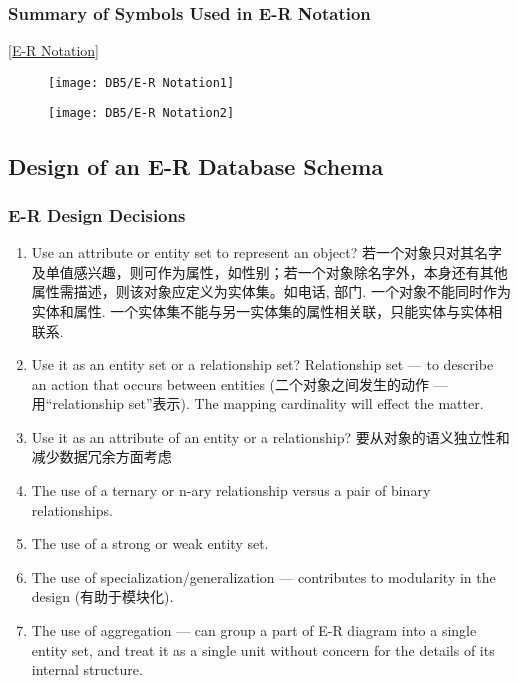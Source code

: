 \subsubsection{Summary of Symbols Used in E-R Notation}
\ref{E-R Notation}

\begin{figure*}[htb]
    \centering
    \begin{subfigure}{0.48\textwidth}
        \centering
        \texttt{[image: DB5/E-R Notation1]}
    \end{subfigure}
    \begin{subfigure}{0.48\textwidth}
        \centering
        \texttt{[image: DB5/E-R Notation2]}
    \end{subfigure}
    \caption{E-R Notation}
    \label{E-R Notation}
\end{figure*}




\subsection{Design of an E-R Database Schema}
\subsubsection{E-R Design Decisions}
\begin{enumerate}
    \item Use an attribute or entity set to represent an object?
    \subitem 若一个对象只对其名字及单值感兴趣，则可作为属性，如性别；若一个对象除名字外，本身还有其他属性需描述，则该对象应定义为实体集。如电话, 部门. 
    \subitem 一个对象不能同时作为实体和属性. 
    \subitem 一个实体集不能与另一实体集的属性相关联，只能实体与实体相联系. 
    \item Use it as an entity set or a relationship set?
    \subitem Relationship set --- to describe an action that occurs between entities (二个对象之间发生的动作 --- 用``relationship set''表示).
    \subitem The mapping cardinality will effect the matter.
    \item Use it as an attribute of an entity or a relationship?
    \subitem 要从对象的语义独立性和减少数据冗余方面考虑
    \item The use of a ternary or n-ary relationship versus a pair of binary relationships.
    \item The use of a strong or weak entity set. 
    \item The use of specialization/generalization --– contributes to modularity in the design (有助于模块化). 
    \item The use of aggregation –-- can group a part of E-R diagram into a single entity set, and treat it as a single unit without concern for the details of its internal structure.
\end{enumerate}

